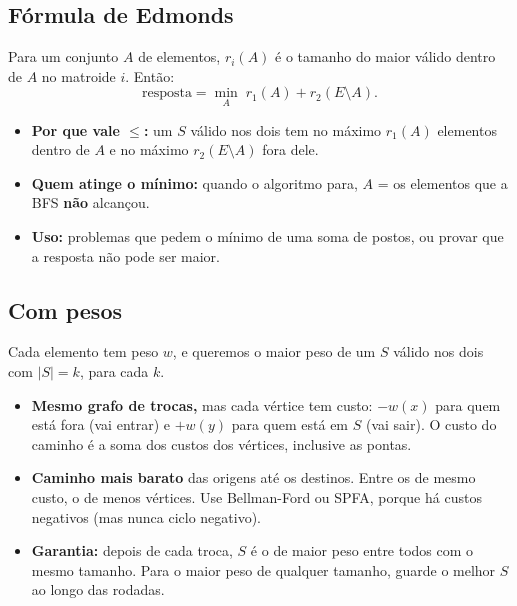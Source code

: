 \subsection*{Fórmula de Edmonds}

Para um conjunto $A$ de elementos, $r_i(A)$ é o tamanho do maior válido dentro de $A$ no matroide $i$. Então:
\[ \text{resposta} = \min_{A} \; r_1(A) + r_2(E \setminus A). \]
\begin{itemize}
  \item \textbf{Por que vale $\le$:} um $S$ válido nos dois tem no máximo $r_1(A)$ elementos dentro de $A$ e no máximo
        $r_2(E \setminus A)$ fora dele.
  \item \textbf{Quem atinge o mínimo:} quando o algoritmo para, $A$ = os elementos que a BFS \textbf{não} alcançou.
  \item \textbf{Uso:} problemas que pedem o mínimo de uma soma de postos, ou provar que a resposta não pode ser maior.
\end{itemize}

\subsection*{Com pesos}

Cada elemento tem peso $w$, e queremos o maior peso de um $S$ válido nos dois com $|S| = k$, para cada $k$.
\begin{itemize}
  \item \textbf{Mesmo grafo de trocas,} mas cada vértice tem custo: $-w(x)$ para quem está fora (vai entrar) e
        $+w(y)$ para quem está em $S$ (vai sair). O custo do caminho é a soma dos custos dos vértices, inclusive as
        pontas.
  \item \textbf{Caminho mais barato} das origens até os destinos. Entre os de mesmo custo, o de menos vértices. Use
        Bellman-Ford ou SPFA, porque há custos negativos (mas nunca ciclo negativo).
  \item \textbf{Garantia:} depois de cada troca, $S$ é o de maior peso entre todos com o mesmo tamanho. Para o maior
        peso de qualquer tamanho, guarde o melhor $S$ ao longo das rodadas.
\end{itemize}
